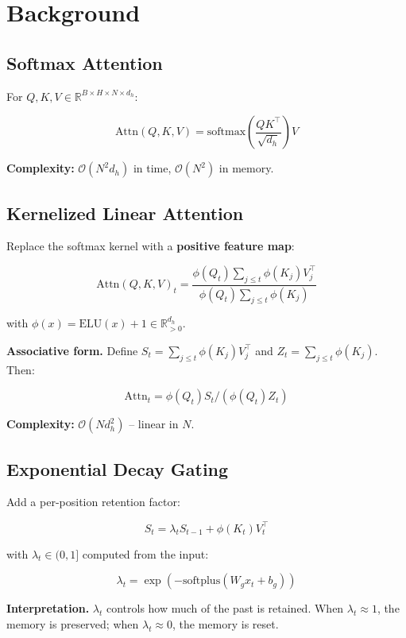 
\section{Background}

\subsection{Softmax Attention}

For $Q, K, V \in \mathbb{R}^{B \times H \times N \times d_h}$:

\[
\text{Attn}(Q, K, V) = \text{softmax}\!\left(\frac{Q K^\top}{\sqrt{d_h}}\right) V
\tag{3.1}
\]

\textbf{Complexity:} $\mathcal{O}(N^2 d_h)$ in time, $\mathcal{O}(N^2)$ in memory.

\subsection{Kernelized Linear Attention}

Replace the softmax kernel with a \textbf{positive feature map}:

\[
\text{Attn}(Q, K, V)_t = \frac{\phi(Q_t) \sum_{j \leq t} \phi(K_j) V_j^\top}{\phi(Q_t) \sum_{j \leq t} \phi(K_j)}
\tag{3.2}
\]

with $\phi(x) = \text{ELU}(x) + 1 \in \mathbb{R}_{>0}^{d_h}$.

\textbf{Associative form.} Define $S_t = \sum_{j \leq t} \phi(K_j) V_j^\top$ and 
$Z_t = \sum_{j \leq t} \phi(K_j)$. Then:

\[
\text{Attn}_t = \phi(Q_t) S_t / (\phi(Q_t) Z_t)
\tag{3.3}
\]

\textbf{Complexity:} $\mathcal{O}(N d_h^2)$ -- linear in $N$.

\subsection{Exponential Decay Gating}

Add a per-position retention factor:

\[
S_t = \lambda_t S_{t-1} + \phi(K_t) V_t^\top
\tag{3.4}
\]

with $\lambda_t \in (0, 1]$ computed from the input:

\[
\lambda_t = \exp(-\text{softplus}(W_g x_t + b_g))
\tag{3.5}
\]

\textbf{Interpretation.} $\lambda_t$ controls how much of the past is retained. 
When $\lambda_t \approx 1$, the memory is preserved; when $\lambda_t \approx 0$, 
the memory is reset.

